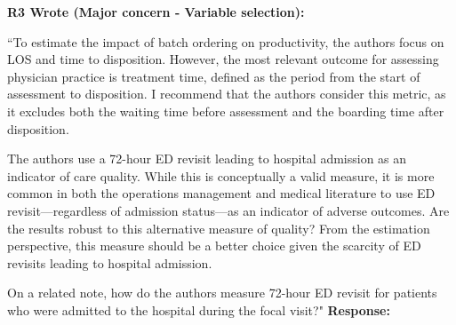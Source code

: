 \documentclass[11pt]{article}
\newenvironment{quote2}
{ \bigskip
\noindent
         \small\em
         \baselineskip=14pt
}
\newcommand{\1}{\hbox{\rm 1\kern-.35em 1}}
\begin{document}
{{\color{black}


\begin{quote2}
\textbf{R3 Wrote (Major concern -  Variable selection):}  

\noindent``To estimate the impact of batch ordering on productivity, the authors focus on LOS and time to disposition. However, the most relevant outcome for assessing physician practice is treatment time, defined as the period from the start of assessment to disposition. I recommend that the authors consider this metric, as it excludes both the waiting time before assessment and the boarding time after disposition.

The authors use a 72-hour ED revisit leading to hospital admission as an indicator of care quality. While this is conceptually a valid measure, it is more common in both the operations management and medical literature to use ED revisit—regardless of admission status—as an indicator of adverse outcomes. Are the results robust to this alternative measure of quality? From the estimation perspective, this measure should be a better choice given the scarcity of ED revisits leading to hospital admission.

On a related note, how do the authors measure 72-hour ED revisit for patients who were admitted to the hospital during the focal visit?"
\end{quote2}

\noindent\textbf{Response:} }}
\end{document}
